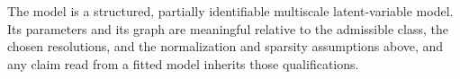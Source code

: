 \begin{remark}
The model is a structured, partially identifiable multiscale latent-variable
model. Its parameters and its graph are meaningful relative to the admissible
class, the chosen resolutions, and the normalization and sparsity assumptions
above, and any claim read from a fitted model inherits those qualifications.
\end{remark}
